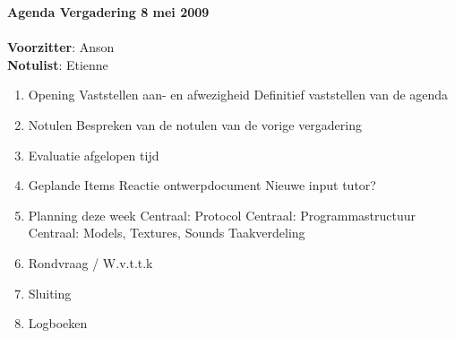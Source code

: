 \documentclass[11pt,oneside,a4paper]{article}
\begin{document}
\textbf{{\LARGE{Agenda Vergadering 8 mei 2009}}}\\ \\
\textbf{Voorzitter}: Anson\\
\textbf{Notulist}: Etienne\\

\begin{enumerate}

    \item Opening
    		\subitem Vaststellen aan- en afwezigheid
    		\subitem Definitief vaststellen van de agenda
    \item Notulen
        \subitem Bespreken van de notulen van de vorige vergadering
	 \item Evaluatie afgelopen tijd
    \item Geplande Items
			\subitem Reactie ontwerpdocument
			\subitem Nieuwe input tutor?
    \item Planning deze week
    		\subitem Centraal: Protocol
    		\subitem Centraal: Programmastructuur
		   \subitem Centraal: Models, Textures, Sounds
		   \subitem Taakverdeling
    \item Rondvraag / W.v.t.t.k
    \item Sluiting

    \item Logboeken

\end{enumerate}
\end{document}
